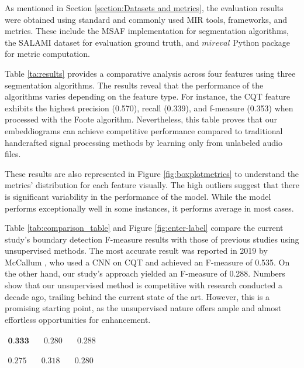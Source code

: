 
As mentioned in Section \ref{section:Datasets and metrics}, the evaluation results were obtained using standard and commonly used MIR tools, frameworks, and metrics. These include the MSAF \cite{MSAF} implementation for segmentation algorithms, the SALAMI dataset \cite{Smith2011DESIGNANNOTATIONS} for evaluation ground truth, and $mireval$ Python package \cite{RaffelMir_eval:METRICS} for metric computation.

Table \ref{ta:results} provides a comparative analysis across four features using three segmentation algorithms. The results reveal that the performance of the algorithms varies depending on the feature type. For instance, the CQT feature exhibits the highest precision (0.570), recall (0.339), and f-measure (0.353) when processed with the Foote algorithm. Nevertheless, this table proves that our embeddiograms can achieve competitive performance compared to traditional handcrafted signal processing methods by learning only from unlabeled audio files.

These results are also represented in Figure \ref{fig:boxplotmetrics} to understand the metrics' distribution for each feature visually. The high outliers suggest that there is significant variability in the performance of the model. While the model performs exceptionally well in some instances, it performs average in most cases.

Table \ref{tab:comparison_table} and Figure \ref{fig:enter-label} compare the current study's boundary detection F-measure results with those of previous studies using unsupervised methods. The most accurate result was reported in 2019 by McCallum \cite{deepfeaturesegment}, who used a CNN on CQT and achieved an F-measure of 0.535. On the other hand, our study's approach yielded an F-measure of 0.288. Numbers show that our unsupervised method is competitive with research conducted a decade ago, trailing behind the current state of the art. However, this is a promising starting point, as the unsupervised nature offers ample and almost effortless opportunities for enhancement.


\newsavebox\embeddiobSF
\begin{lrbox}{\embeddiobSF}
   $\begin{aligned}
     \textbf{0.333} & \quad 0.280 & \quad 0.288
    \end{aligned} $
\end{lrbox}

\newsavebox\embeddiobFoote
\begin{lrbox}{\embeddiobFoote}
   $\begin{aligned}
     0.275 & \quad 0.318 & \quad 0.280
    \end{aligned} $
\end{lrbox}

